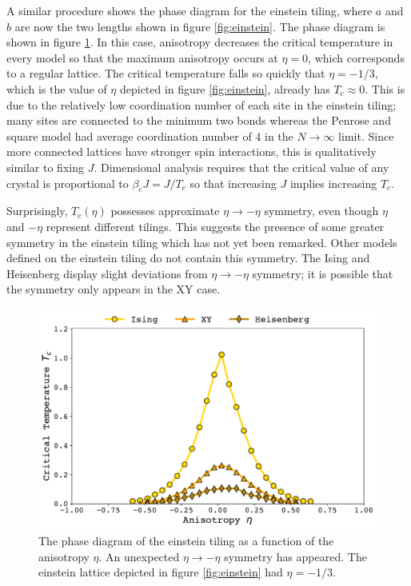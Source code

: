 \documentclass[
  amsmath,
  amssymb,
  aps,
  twocolumn,
  nofootinbib,
  floatfix,
]{revtex4-2}
\begin{document}
A similar procedure shows the phase diagram for the einstein tiling, where $a$ and $b$ are now the two lengths shown in figure \ref{fig:einstein}. The phase diagram is shown in figure \ref{fig:einstein-phase}. In this case, anisotropy decreases the critical temperature in every model so that the maximum anisotropy occurs at $\eta = 0$, which corresponds to a regular lattice. The critical temperature falls so quickly that $\eta = -1/3$, which is the value of $\eta$ depicted in figure \ref{fig:einstein}, already has $T_c \approx 0$. This is due to the relatively low coordination number of each site in the einstein tiling; many sites are connected to the minimum two bonds whereas the Penrose and square model had average coordination number of 4 in the $N\rightarrow \infty$ limit. Since more connected lattices have stronger spin interactions, this is qualitatively similar to fixing $J$. Dimensional analysis requires that the critical value of any crystal is proportional to $\beta_c J = J/T_c$ so that increasing $J$ implies increasing $T_c$.

Surprisingly, $T_c(\eta)$ possesses approximate $\eta\rightarrow -\eta$ symmetry, even though $\eta$ and $-\eta$ represent different tilings. This suggests the presence of some greater symmetry in the einstein tiling which has not yet been remarked. Other models defined on the einstein tiling do not contain this symmetry. The Ising and Heisenberg display slight deviations from $\eta\rightarrow -\eta$ symmetry; it is possible that the symmetry only appears in the XY case.

\begin{figure}
  \centering
  \includegraphics[width=\linewidth]{../figs/einstein-phase.pdf}
  \caption{The phase diagram of the einstein tiling as a function of the anisotropy $\eta$. An unexpected $\eta \rightarrow -\eta$ symmetry has appeared. The einstein lattice depicted in figure \ref{fig:einstein} had $\eta = -1/3$.}
  \label{fig:einstein-phase}
\end{figure}
\end{document}
